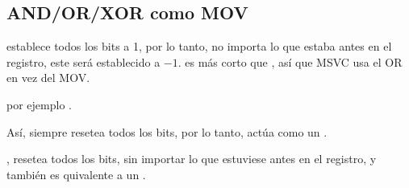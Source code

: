 
\subsection{AND/OR/XOR como MOV}

 establece todos los bits a 1, por lo tanto, no importa lo que estaba antes en el registro, este será establecido a $-1$.
 es más corto que , así que MSVC usa el OR en vez del MOV.

por ejemplo .

Así,  siempre resetea todos los bits, por lo tanto, actúa como un .

, resetea todos los bits, sin importar lo que estuviese antes en el registro, y también es quivalente a un .
